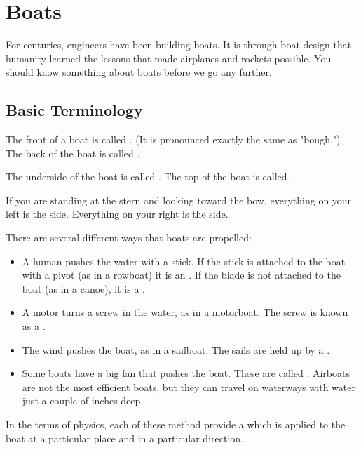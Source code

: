 \chapter{Boats}

For centuries,  engineers have been building boats.  It is through boat design that humanity learned the lessons that made airplanes and rockets possible.  
You should know something about boats before we go any further.

\section{Basic Terminology}

The front of a boat is called . (It is pronounced exactly the same as "bough.")   The back of the boat is called .

The underside of the boat is called .  The top of the boat is called .

If you are standing at the stern and looking toward the bow,  everything on your left is the  side.  Everything on your right is the  side.

There are several different ways that boats are propelled:

\begin{itemize}

\item A human pushes the water with a stick.  If the stick is attached to the boat with a pivot (as in a rowboat) it is an .  If the blade is not attached to the boat (as in a canoe), it is a .

\item A motor turns a screw in the water, as in a motorboat. The screw is known as a .

\item The wind pushes the boat,  as in a sailboat.  The sails are held up by a .

\item Some boats have a big fan that pushes the boat.  These are called .   Airboats are not the most efficient boats,  but they can travel
on waterways with water just a couple of inches deep.

\end{itemize}

In the terms of physics,  each of these method provide a  which is applied to the boat at a particular place and in a particular direction.



